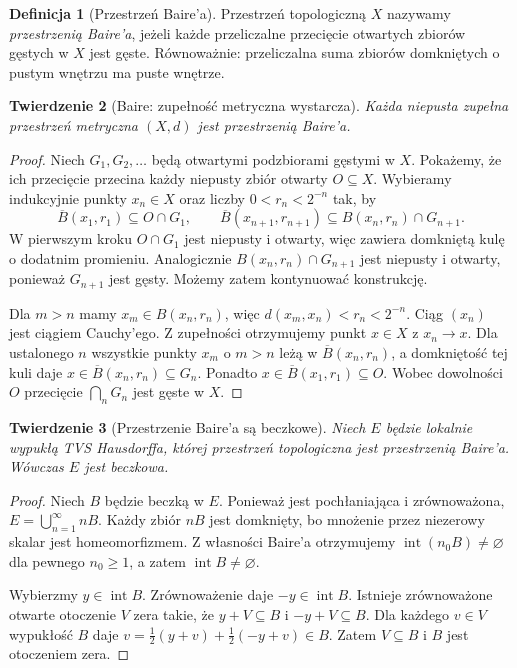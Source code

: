 \documentclass[11pt,a4paper]{article}
\numberwithin{equation}{section}
\theoremstyle{plain}
\newtheorem{twierdzenie}{Twierdzenie}[section]
\theoremstyle{definition}
\newtheorem{definicja}[twierdzenie]{Definicja}
\theoremstyle{remark}
\begin{document}
\begin{definicja}[Przestrzeń Baire'a]
Przestrzeń topologiczną $X$ nazywamy \emph{przestrzenią Baire'a},
jeżeli każde przeliczalne przecięcie otwartych zbiorów gęstych
w $X$ jest gęste. Równoważnie: przeliczalna suma zbiorów
domkniętych o pustym wnętrzu ma puste wnętrze.
\end{definicja}

\begin{twierdzenie}[Baire: zupełność metryczna wystarcza]
\label{thm:baire-complete}
Każda niepusta zupełna przestrzeń metryczna $(X,d)$
jest przestrzenią Baire'a.
\end{twierdzenie}
\begin{proof}
Niech $G_1,G_2,\ldots$ będą otwartymi podzbiorami
gęstymi w $X$. Pokażemy, że ich przecięcie przecina
każdy niepusty zbiór otwarty $O\subseteq X$.
Wybieramy indukcyjnie punkty $x_n\in X$ oraz
liczby $0<r_n<2^{-n}$ tak, by
\[
 \overline{B}(x_1,r_1)\subseteq O\cap G_1,\qquad
 \overline{B}(x_{n+1},r_{n+1})\subseteq
 B(x_n,r_n)\cap G_{n+1}.
\]
W pierwszym kroku $O\cap G_1$ jest niepusty i otwarty,
więc zawiera domkniętą kulę o dodatnim promieniu.
Analogicznie $B(x_n,r_n)\cap G_{n+1}$ jest niepusty
i otwarty, ponieważ $G_{n+1}$ jest gęsty. Możemy
zatem kontynuować konstrukcję.

Dla $m>n$ mamy $x_m\in B(x_n,r_n)$, więc
$d(x_m,x_n)<r_n<2^{-n}$. Ciąg $(x_n)$ jest ciągiem
Cauchy'ego. Z zupełności otrzymujemy punkt $x\in X$
z $x_n\to x$. Dla ustalonego $n$ wszystkie punkty
$x_m$ o $m>n$ leżą w $\overline B(x_n,r_n)$,
a domkniętość tej kuli daje
$x\in\overline B(x_n,r_n)\subseteq G_n$.
Ponadto $x\in\overline B(x_1,r_1)\subseteq O$.
Wobec dowolności $O$ przecięcie $\bigcap_nG_n$
jest gęste w $X$.
\end{proof}

\begin{twierdzenie}[Przestrzenie Baire'a są beczkowe]\label{thm:baire-barrelled}
Niech $E$ będzie lokalnie wypukłą TVS Hausdorffa, której
przestrzeń topologiczna jest przestrzenią Baire'a.
Wówczas $E$ jest beczkowa.
\end{twierdzenie}
\begin{proof}
Niech $B$ będzie beczką w $E$. Ponieważ jest pochłaniająca
i zrównoważona, $E=\bigcup_{n=1}^\infty nB$. Każdy zbiór
$nB$ jest domknięty, bo mnożenie przez niezerowy skalar
jest homeomorfizmem. Z własności Baire'a otrzymujemy
$\operatorname{int}(n_0B)\ne\varnothing$ dla pewnego
$n_0\ge1$, a zatem $\operatorname{int}B\ne\varnothing$.

Wybierzmy $y\in\operatorname{int}B$. Zrównoważenie daje
$-y\in\operatorname{int}B$. Istnieje zrównoważone
otwarte otoczenie $V$ zera takie, że
$y+V\subseteq B$ i $-y+V\subseteq B$. Dla każdego
$v\in V$ wypukłość $B$ daje
$v=\frac12(y+v)+\frac12(-y+v)\in B$.
Zatem $V\subseteq B$ i $B$ jest otoczeniem zera.
\end{proof}
\end{document}
